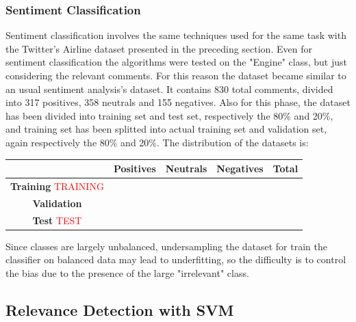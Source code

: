 \subsubsection{Sentiment Classification}

Sentiment classification involves the same techniques used for the same task with the Twitter's Airline dataset presented in the preceding section. Even for sentiment classification the algorithms were tested on the "Engine" class, but just considering the relevant comments. For this reason the dataset became similar to an usual sentiment analysis's dataset. It contains 830 total comments, divided into 317 positives, 358 neutrals and 155 negatives. Also for this phase, the dataset has been divided into training set and test set, respectively the 80\% and 20\%, and training set has been splitted into actual training set and validation set, again respectively the 80\% and 20\%. The distribution of the datasets is:

\begin{center}
	\begin{tabular}{ | c  c  c c | c | } 
		\hline
		& \textbf{Positives} & \textbf{Neutrals} & \textbf{Negatives} & \textbf{Total} \\
		\hline
		
		\textbf{Training} \textcolor{red}{TRAINING} &  &  &  & \\ 
		\hline
		\textbf{Validation} &  &  &  & \\ 
		\hline
		\textbf{Test} \textcolor{red}{TEST} &  &  &  & \\
		\hline
	\end{tabular}
\end{center}

Since classes are largely unbalanced, undersampling the dataset for train the classifier on balanced data may lead to underfitting, so the difficulty is to control the bias due to the presence of the large "irrelevant" class.



\subsection{Relevance Detection with SVM}

